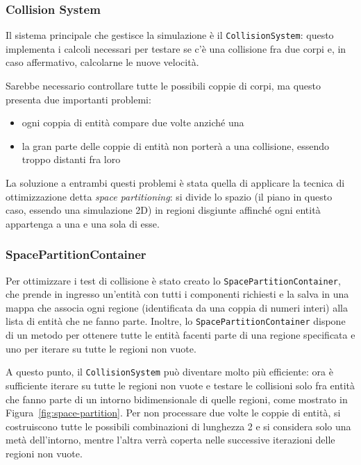 \subsubsection{Collision System}\label{subsubsec:container}
Il sistema principale che gestisce la simulazione è il \texttt{CollisionSystem}: questo implementa i calcoli necessari
per testare se c'è una collisione fra due corpi e, in caso affermativo, calcolarne le nuove velocità.

Sarebbe necessario controllare tutte le possibili coppie di corpi, ma questo presenta due importanti problemi:
\begin{itemize}
    \item ogni coppia di entità compare due volte anziché una
    \item la gran parte delle coppie di entità non porterà a una collisione, essendo troppo distanti fra loro
\end{itemize}

La soluzione a entrambi questi problemi è stata quella di applicare la tecnica di ottimizzazione detta
\textit{space partitioning}: si divide lo spazio (il piano in questo caso, essendo una simulazione 2D) in regioni
disgiunte affinché ogni entità appartenga a una e una sola di esse.

\subsubsection{SpacePartitionContainer}
Per ottimizzare i test di collisione è stato creato lo \texttt{SpacePartitionContainer}, che prende in ingresso
un'entità con tutti i componenti richiesti e la salva in una mappa che associa ogni regione (identificata da una coppia
di numeri interi) alla lista di entità che ne fanno parte.
Inoltre, lo \texttt{SpacePartitionContainer} dispone di un metodo per ottenere tutte le entità facenti parte di una
regione specificata e uno per iterare su tutte le regioni non vuote.

A questo punto, il \texttt{CollisionSystem} può diventare molto più efficiente: ora è sufficiente iterare su tutte le
regioni non vuote e testare le collisioni solo fra entità che fanno parte di un intorno bidimensionale di quelle
regioni, come mostrato in Figura~\ref{fig:space-partition}.
Per non processare due volte le coppie di entità, si costruiscono tutte le possibili combinazioni di lunghezza 2 e si
considera solo una metà dell'intorno, mentre l'altra verrà coperta nelle successive iterazioni delle regioni non vuote.

